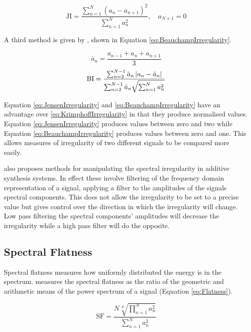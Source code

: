 		\begin{equation}
			\textrm{JI} = \frac{\sum_{n = 1}^{N} (a_{n} - a_{n+1})^{2}}
			                   {\sum_{n = 1}^{N} a_{n}^{2}},
			              \quad a_{N+1} = 0
			\label{eq:JensenIrregularity}
		\end{equation}

		A third method is given by \citet{beauchamp2007analysis}, shown in Equation \ref{eq:BeauchampIrregularity}.

		\[ \bar{a}_{n} = \frac{a_{n-1} + a_{n} + a_{n+1}}{3} \]
		\begin{equation}
			\textrm{BI} = \frac{\sum_{n = 2}^{N - 1} \bar{a}_{n} \left|a_{n} - \bar{a}_{n}\right|}
					   {\sum_{n = 2}^{N - 1} \bar{a}_{n} \sqrt{\sum_{n = 1}^{N} a_{n}^{2}}}
			\label{eq:BeauchampIrregularity}
		\end{equation}

		Equation \ref{eq:JensenIrregularity} and \ref{eq:BeauchampIrregularity} have an advantage over
		\ref{eq:KrimphoffIrregularity} in that they produce normalised values. Equation \ref{eq:JensenIrregularity}
		produces values between zero and two while Equation \ref{eq:BeauchampIrregularity} produces values between
		zero and one. This allows measures of irregularity of two different signals to be compared more easily.

		\citet{beauchamp2007analysis} also proposes methods for manipulating the spectral irregularity in additive
		synthesis systems. In effect these involve filtering of the frequency domain representation of a signal,
		applying a filter to the amplitudes of the signals spectral components. This does not allow the
		irregularity to be set to a precise value but gives control over the direction in which the irregularity
		will change. Low pass filtering the spectral components' amplitudes will decrease the irregularity while a
		high pass filter will do the opposite.

	\subsection{Spectral Flatness}
	\label{sec:FeatureControl-Parameterisation-Flatness}
		Spectral flatness measures how uniformly distributed the energy is in the spectrum.
		\citet{johnston1988transform} measures the spectral flatness as the ratio of the geometric and arithmetic
		means of the power spectrum of a signal (Equation \ref{eq:Flatness}).

		\begin{equation}
			\textrm{SF} = \frac{N\sqrt[N]{\prod_{n = 1}^{N} a_{n}^{2}}}
				           {\sum_{n = 1}^{N} a_{n}^{2}}
			\label{eq:Flatness}
		\end{equation}

